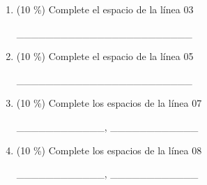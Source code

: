 \documentclass[twocolumn]{article}
\begin{document}
\begin{enumerate}[label=\Alph*]


	\item (10 \%) Complete el espacio de la línea 03

	\_\_\_\_\_\_\_\_\_\_\_\_\_\_\_\_\_\_\_\_\_\_\_\_

	\item (10 \%) Complete el espacio de la línea 05

	\_\_\_\_\_\_\_\_\_\_\_\_\_\_\_\_\_\_\_\_\_\_\_\_

	\item (10 \%) Complete los espacios de la línea 07	

	\_\_\_\_\_\_\_\_\_\_\_\_, \_\_\_\_\_\_\_\_\_\_\_\_

	\item (10 \%) Complete los espacios de la línea 08	

	\_\_\_\_\_\_\_\_\_\_\_\_, \_\_\_\_\_\_\_\_\_\_\_\_
\end{enumerate} 


\end{document}
